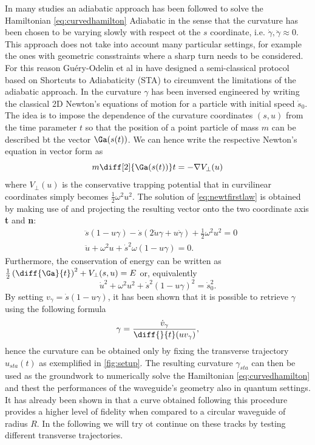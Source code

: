 In many studies an adiabatic approach has been followed to solve the Hamiltonian \eqref{eq:curvedhamilton} 
Adiabatic in the sense that the curvature has been chosen to be varying slowly with respect ot the $s$ coordinate, i.e. $\dot{\gamma}, \ddot{\gamma} \approx 0 $.
This approach does not take into account many particular settings, for example the ones with geometric consstraints where a sharp turn needs to be considered.
For this reason Gu\'ery-Odelin et al in \cite{QuantumControlImpens2020} have designed a semi-classical protocol based on Shortcuts to Adiabaticity (STA) to circumvent the limitations of the adiabatic approach.
In \cite{QuantumControlImpens2020} the curvature $\gamma$ has been inversed engineered by writing the classical 2D Newton's equations of motion for a particle with initial speed $\dot{s}_0$.
The idea is to impose the dependence of the curvature coordinates $(s,u)$ from the time parameter $t$ so that the position of a point particle of mass $m$ can be described bt the vector $\Ga(s(t))$.
We can hence write the respective Newton's equation in vector form as 
\begin{equation}
	\label{eq:newtfirstlaw}
	m \diff[2]{\Ga(s(t))} t = - \nabla V_\perp (u)
\end{equation}
where $ V_\perp(u) $ is the conservative trapping potential that in curvilinear coordinates simply becomes $ \frac{1}{2}\omega^2 u^2 $.
The solution of \eqref{eq:newtfirstlaw} is obtained by making use of  and projecting the resulting vector onto the two coordinate axis \textbf{t} and \textbf{n}:
\begin{align}
	& \ddot{s} (1-u\gamma)  -\dot{s}(2\dot{u}\gamma + u \dot{\gamma}) + \frac{1}{2}\omega^2u^2 = 0 \\
	& \ddot{u} + \omega^2u + \dot{s}^2\omega(1-u\gamma)  = 0.
\end{align}
Furthermore, the conservation of energy can be written as $\frac{1}{2}\left(\diff{\Ga}{t}\right)^2 + V_\perp(s,u) = E$ or, equivalently
\begin{equation}
	\label{eq:energyconserve}
	\dot{u}^2 + \omega^2u^2 + \dot{s}^2(1-u\gamma)^2 = \dot{s}_0^2.
\end{equation}
By setting $ v_\gamma = \dot{s}(1-u\gamma)   $, it has been shown that it is possible to retrieve $ \gamma $ using the following formula
\begin{equation}
	\label{eq:stacurvature}
	\gamma = \frac{\dot{v}_\gamma}{\diff{}{t}(uv_\gamma)}	,
\end{equation}
hence the curvature can be obtained only by fixing the transverse trajectory $ u_{sta}(t) $ as exemplified in \cref{fig:setup}.
The resulting curvature $ \gamma_{sta} $ can then be used as the groundwork to numerically solve the Hamiltonian \eqref{eq:curvedhamilton} and thest the performances of the waveguide's geometry also in quantum settings.
It has already been shown in \cite{QuantumControlImpens2020} that a curve obtained following this procedure provides a higher level of fidelity when  compared to a circular waveguide of radius $R$.
In the following we will try ot continue on these tracks by testing different transverse trajectories.
